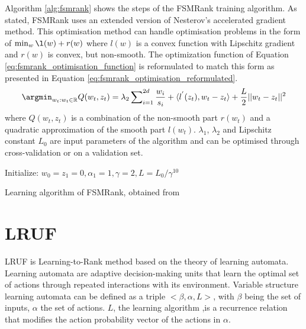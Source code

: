 Algorithm \ref{alg:fsmrank} shows the steps of the FSMRank training algorithm. As stated, FSMRank uses an  extended version of Nesterov's accelerated gradient method. This optimisation method can handle optimisation problems in the form of $\min_w \l(w) + r(w)$ where $l(w)$ is a convex function with Lipschitz gradient and $r(w)$ is convex, but non-smooth. The optimization function of Equation \ref{eq:fsmrank_optimisation_function} is reformulated to match this form as presented in Equation \ref{eq:fsmrank_optimisation_reformulated}.
\begin{equation}
\argmin_{w_t:w_t\in \mathbb{R}} Q(w_t,z_t) = \lambda_2 \sum\nolimits_{i=1}^{2d}\frac{w_i}{s_i}+\langle l^{'}(z_t),w_t-z_t \rangle+\frac{L}{2}||w_t-z_t||^2
\label{eq:fsmrank_optimisation_reformulated}
\end{equation}
\noindent where $Q(w_t,z_t)$ is a combination of the non-smooth part $r(w_t)$ and a quadratic approximation of the smooth part $l(w_t)$. $\lambda_1$, $\lambda_2$ and Lipschitz constant $L_0$ are input parameters of the algorithm and can be optimised through cross-validation or on a validation set.\\

\LinesNumbered
\begin{algorithm}[H]
 Initialize: $w_0=z_1=0, \alpha_1=1, \gamma=2, L=L_0/\gamma^{10}$\\
 
 \caption{Learning algorithm of FSMRank, obtained from \cite{Lai2013c}}
 \label{alg:fsmrank}
\end{algorithm}

\section{LRUF}
LRUF \cite{Torkestani2012b} is Learning-to-Rank method based on the theory of learning automata. Learning automata are adaptive decision-making units that learn the optimal set of actions through repeated interactions with its environment. Variable structure learning automata can be defined as a triple $<\beta,\alpha,L>$, with $\beta$ being the set of inputs, $\alpha$ the set of actions. $L$, the learning algorithm ,is a recurrence relation that modifies the action probability vector of the actions in $\alpha$.\\

